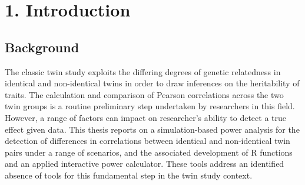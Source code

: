 \chapter*{1. Introduction}
\setcounter{chapter}{1}

			

\large


\section{Background}
The classic twin study exploits the differing degrees of genetic relatedness in identical and non-identical twins in order to draw inferences on the heritability of traits.  The calculation and comparison of Pearson correlations across the two twin groups is a routine preliminary step undertaken by researchers in this field.  However, a range of factors can impact on researcher's ability to detect a true effect given data.  This thesis reports on a simulation-based power analysis for the detection of differences in correlations between identical and non-identical twin pairs under a range of scenarios, and the associated development of R functions and an applied interactive power calculator.  These tools address an identified absence of tools for this fundamental step in the twin study context.
 
